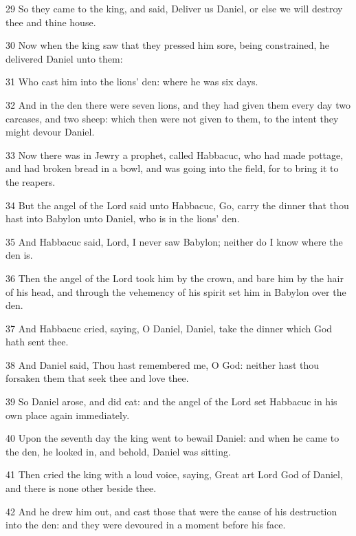 \par 29 So they came to the king, and said, Deliver us Daniel, or else we will destroy thee and thine house.
\par 30 Now when the king saw that they pressed him sore, being constrained, he delivered Daniel unto them:
\par 31 Who cast him into the lions' den: where he was six days.
\par 32 And in the den there were seven lions, and they had given them every day two carcases, and two sheep: which then were not given to them, to the intent they might devour Daniel.
\par 33 Now there was in Jewry a prophet, called Habbacuc, who had made pottage, and had broken bread in a bowl, and was going into the field, for to bring it to the reapers.
\par 34 But the angel of the Lord said unto Habbacuc, Go, carry the dinner that thou hast into Babylon unto Daniel, who is in the lions' den.
\par 35 And Habbacuc said, Lord, I never saw Babylon; neither do I know where the den is.
\par 36 Then the angel of the Lord took him by the crown, and bare him by the hair of his head, and through the vehemency of his spirit set him in Babylon over the den.
\par 37 And Habbacuc cried, saying, O Daniel, Daniel, take the dinner which God hath sent thee.
\par 38 And Daniel said, Thou hast remembered me, O God: neither hast thou forsaken them that seek thee and love thee.
\par 39 So Daniel arose, and did eat: and the angel of the Lord set Habbacuc in his own place again immediately.
\par 40 Upon the seventh day the king went to bewail Daniel: and when he came to the den, he looked in, and behold, Daniel was sitting.
\par 41 Then cried the king with a loud voice, saying, Great art Lord God of Daniel, and there is none other beside thee.
\par 42 And he drew him out, and cast those that were the cause of his destruction into the den: and they were devoured in a moment before his face.

